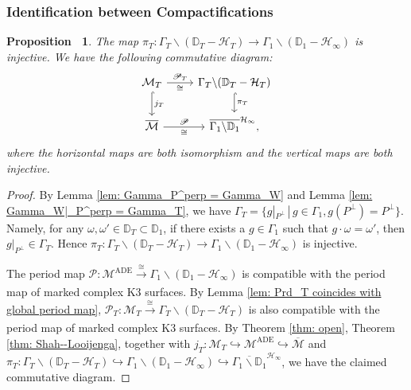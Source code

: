 \documentclass[12pt,reqno,a4paper]{amsart}
\newtheorem{prop}[thm]{Proposition~}
\theoremstyle{remark}
\theoremstyle{definition}
\newcommand{\DD}{\mathbb{D}}
\newcommand{\Prd}{\mathscr{P}}
\newcommand{\calH}{\mathcal{H}}
\newcommand{\calM}{\mathcal{M}}
\newcommand{\bs}{\backslash}
\begin{document}
\subsubsection{Identification between Compactifications}
\begin{prop}
\label{prop: comm diag, open to compact}
    The map $\pi_T\colon\Gamma_T\bs(\DD_T-\calH_T)\to\Gamma_1\bs(\DD_1-\calH_\infty)$ is injective.
    We have the following commutative diagram:
    \begin{equation*}
    \begin{tikzcd}
      \calM_T  \arrow[r,"\Prd_T","\cong"'] \arrow[d,hook,"j_T"] & \Gamma_T\bs(\DD_T-\calH_T) \arrow[d,hook,"\pi_T"] \\
      \overline{\calM} \arrow[r,"\Prd","\cong"'] & \overline{\Gamma_1\bs\DD_1}^{\calH_\infty},
    \end{tikzcd}
    \end{equation*}
    where the horizontal maps are both isomorphism and the vertical maps are both injective.
\end{prop}
\begin{proof}
    By Lemma \ref{lem: Gamma_P^perp = Gamma_W} and Lemma \ref{lem: Gamma_W|_P^perp = Gamma_T}, we have $\Gamma_T = \{ g|_{P^\perp} \,|\, g\in\Gamma_1, g(P^\perp)=P^\perp \}$.
    Namely, for any $\omega,\omega'\in\DD_T\subset\DD_1$, if there exists a $g\in\Gamma_1$ such that $g\cdot\omega=\omega'$, then $g|_{P^\perp}\in\Gamma_T$.
    Hence $\pi_T\colon\Gamma_T\bs(\DD_T-\calH_T)\to\Gamma_1\bs(\DD_1-\calH_\infty)$ is injective.
    
    The period map $\Prd\colon\calM^{\mathrm{ADE}}\xrightarrow[]{\cong}\Gamma_1\bs(\DD_1-\calH_\infty)$ is compatible with the period map of marked complex K3 surfaces.
    By Lemma \ref{lem: Prd_T coincides with global period map}, $\Prd_T\colon\calM_T\xrightarrow[]{\cong}\Gamma_T\bs(\DD_T-\calH_T)$ is also compatible with the period map of marked complex K3 surfaces.
    By Theorem \ref{thm: open}, Theorem \ref{thm: Shah--Looijenga}, together with $j_T\colon \calM_T\hookrightarrow\calM^{\mathrm{ADE}}\hookrightarrow\overline{\calM}$ and $\pi_T\colon \Gamma_T\bs(\DD_T-\calH_T)\hookrightarrow\Gamma_1\bs(\DD_1-\calH_\infty)\hookrightarrow\overline{\Gamma_1\bs\DD_1}^{\calH_\infty}$, we have the claimed commutative diagram.
\end{proof}
\end{document}
